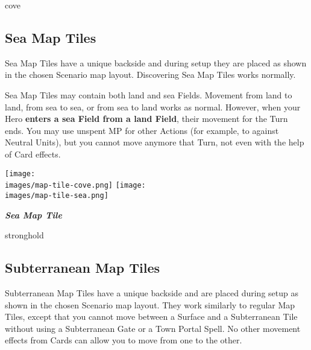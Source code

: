 \begin{multicols*}{2}
\begin{expansion}{cove}
\subsection*{Sea Map Tiles}
Sea Map Tiles have a unique backside and during setup they are placed as shown in the chosen Scenario map layout.
Discovering Sea Map Tiles works normally.\par
Sea Map Tiles may contain both land and sea Fields.
Movement from land to land, from sea to sea, or from sea to land works as normal.
However, when your Hero \textbf{enters a sea Field from a land Field}, their movement for the Turn ends. You may use unspent MP for other Actions (for example, to  against Neutral Units), but you cannot move anymore that Turn, not even with the help of Card effects.

\bigskip
\begin{multicols*}{2}
\hspace{-0.5em}\texttt{[image: \\images/map-tile-cove.png]}
\columnbreak
\hspace{-0.5em}\texttt{[image: \\images/map-tile-sea.png]}
\end{multicols*}
\medskip
\begin{center}
  \footnotesize{\textbf{\textit{\textcolor{darkcandyapplered}{Sea Map Tile}}}}
\end{center}
\medskip


\end{expansion}

\begin{expansion}{stronghold}
\subsection*{Subterranean Map Tiles}
Subterranean Map Tiles have a unique backside and are placed during setup as shown in the chosen Scenario map layout.
They work similarly to regular Map Tiles, except that you cannot move between a Surface and a Subterranean Tile without using a Subterranean Gate or a Town Portal Spell.
No other movement effects from Cards can allow you to move from one to the other.


\end{expansion}
\end{multicols*}
